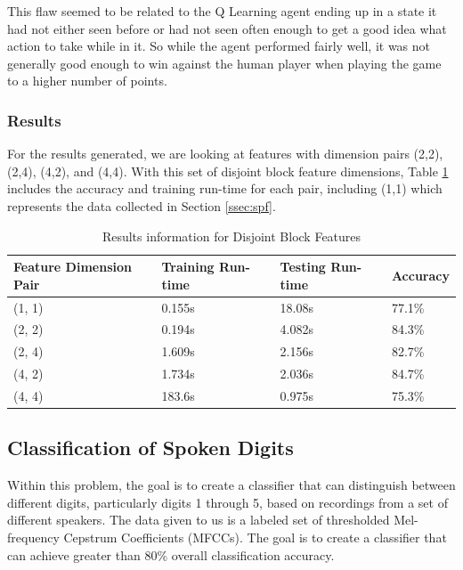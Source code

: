 \documentclass{article}[12pt]
\begin{document}
   This flaw seemed to be related to the Q Learning agent ending up in a state it had not either seen before or had not seen often enough to get a good idea what action to take while in it. So while the agent performed fairly well, it was not generally good enough to win against the human player when playing the game to a higher number of points.
  
  \subsubsection{Results} \label{sssec:disres}
  For the results generated, we are looking at features with dimension pairs (2,2), (2,4), (4,2), and (4,4). With this set of disjoint block feature dimensions, Table \ref{tab:dis} includes the accuracy and training run-time for each pair, including (1,1) which represents the data collected in Section \ref{ssec:spf}.
  
  \begin{table}[ht]
  	\centering
  	\begin{tabular}{l | l | l | l}
  		\hline
  		Feature Dimension Pair & Training Run-time & Testing Run-time & Accuracy  \\
  		\hline \hline 
  		(1, 1) & 0.155s & 18.08s &77.1\% \\
  		(2, 2) & 0.194s & 4.082s &84.3\% \\
  		(2, 4) & 1.609s & 2.156s &82.7\% \\
  		(4, 2) & 1.734s & 2.036s &84.7\% \\
  		(4, 4) & 183.6s & 0.975s &75.3\% \\
  		\hline
  	\end{tabular}
  \caption{Results information for Disjoint Block Features} \label{tab:dis}
  \end{table}
   
   \subsection{Classification of Spoken Digits}
   Within this problem, the goal is to create a classifier that can distinguish between different digits, particularly digits 1 through 5, based on recordings from a set of different speakers. The data given to us is a labeled set of thresholded Mel-frequency Cepstrum Coefficients (MFCCs). The goal is to create a classifier that can achieve greater than 80\% overall classification accuracy. 
   
\end{document}
